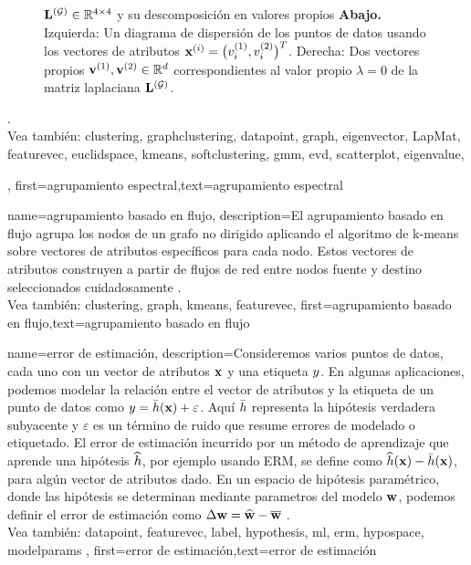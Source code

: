 {{\begin{figure}[H]
\begin{center}
{					${\bf L}^{(\mathcal{G})}  \in \mathbb{R}^{4 \times 4}$ y su descomposición en valores propios 
					{\bf Abajo.} Izquierda: Un diagrama de dispersión de los puntos de datos usando los vectores de atributos
					${\bf x}^{(i)} = \big( v^{(1)}_{i},v^{(2)}_{i} \big)^{T}$. 
					Derecha: Dos vectores propios ${\bf v}^{(1)},{\bf v}^{(2)} \in \mathbb{R}^{d}$ 
					correspondientes al valor propio $\lambda=0$ de la matriz laplaciana ${\bf L}^{(\mathcal{G})}$. 
					} 
			\end{center}
		\end{figure}
	\newpage. \\
	Vea también: \gls{clustering}, \gls{graphclustering}, \gls{datapoint}, \gls{graph}, \gls{eigenvector}, \gls{LapMat}, \gls{featurevec}, \gls{euclidspace}, \gls{kmeans}, \gls{softclustering}, \gls{gmm}, \gls{evd}, \gls{scatterplot}, \gls{eigenvalue},  }, 
	first={agrupamiento espectral},text={agrupamiento espectral} 
}
{name={agrupamiento basado en flujo},
	description={El agrupamiento basado en flujo agrupa los nodos de un 
		grafo no dirigido aplicando el algoritmo de k-means sobre
		vectores de atributos específicos para cada nodo. Estos vectores de atributos construyen a partir de flujos de red entre nodos 
		fuente y destino seleccionados cuidadosamente \cite{FlowSpecClustering2021}.
		\\
	Vea también: \gls{clustering}, \gls{graph}, \gls{kmeans}, \gls{featurevec}}, 
	first={agrupamiento basado en flujo},text={agrupamiento basado en flujo} 
}



{name={error de estimación},
	description={Consideremos varios puntos de datos, cada uno con un vector de atributos ${\bf x}$ y una etiqueta
		$y$. En algunas aplicaciones, podemos modelar la relación entre el vector de atributos y la etiqueta
		de un punto de datos como $y = \bar{h}({\bf x}) + \varepsilon$. Aquí $\bar{h}$ 
		representa la hipótesis verdadera subyacente y $\varepsilon$ es un término de ruido que resume errores de modelado o etiquetado.
		El error de estimación incurrido por un método de aprendizaje que aprende una hipótesis $\widehat{h}$, por ejemplo usando ERM, se define como 
		$\widehat{h}({\bf x}) - \bar{h}({\bf x})$, para algún vector de atributos dado. 
		En un espacio de hipótesis paramétrico, donde las hipótesis se determinan mediante
		parametros del modelo ${\bf w}$, podemos definir el error de estimación como  $\Delta {\bf w} = \widehat{{\bf w}} - \overline{{\bf w}}$ \cite{kay,hastie01statisticallearning}.
		\\
	Vea también: \gls{datapoint}, \gls{featurevec}, \gls{label}, \gls{hypothesis}, \gls{ml}, \gls{erm}, \gls{hypospace}, \glspl{modelparam}  },
	first={error de estimación},text={error de estimación} 
}


